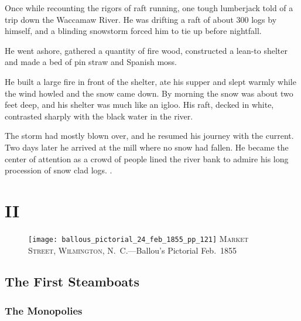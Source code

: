 \documentclass[11pt, a5paper, openright]{book}
\begin{document}
Once while recounting the rigors of raft running, one tough lumberjack
told of a trip down the Waccamaw River.  He was drifting a raft of
about 300 logs by himself, and a blinding snowstorm forced him to tie
up before nightfall.\par

He went ashore, gathered a quantity of fire wood, constructed a
lean-to shelter and made a bed of pin straw and Spanish moss.\par

He built a large fire in front of the shelter, ate his supper and
slept warmly while the wind howled and the snow came down.  By morning
the snow was about two feet deep, and his shelter was much like an
igloo.  His raft, decked in white, contrasted sharply with the black
water in the river.\par

The storm had mostly blown over, and he resumed his journey with the
current.  Two days later he arrived at the mill where no snow had
fallen.  He became the center of attention as a crowd of people lined
the river bank to admire his long procession of snow clad logs.
\citep{stevensjg}.\par

\makeatletter\@openrightfalse%

\part{II}

\begin{figure}[htb]
\centering
  \begin{turn}{90}
      \begin{minipage}{5.8in}
        \centering
        \texttt{[image: ballous\_pictorial\_24\_feb\_1855\_pp\_121]}\newline
        \textsc{Market Street, Wilmington, N.~C.}\newline---Ballou's Pictorial Feb.~1855
      \end{minipage}
    \end{turn}
\end{figure}

\chapter{The First Steamboats}
\@openrighttrue\makeatother

\section{The Monopolies}
\end{document}
